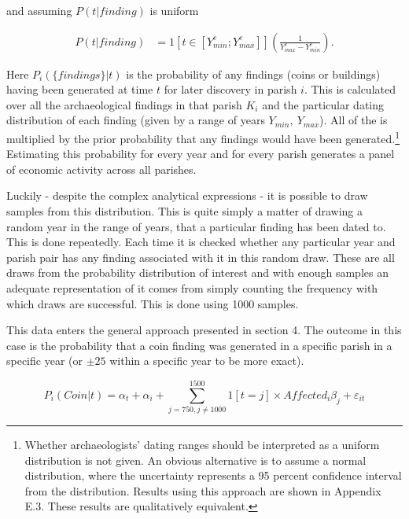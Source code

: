 \documentclass[11pt]{article}
\begin{document}
and assuming $P(t|finding)$ is uniform

\begin{equation}
\begin{split}
\label{eq:arch12}
P(t|finding)& = 1[t\in [Y_{min}^c;Y_{max}^c]] \left(\frac{1}{Y_{max}^c - Y_{min}^c}\right).
\end{split}
\end{equation}

Here $P_i(\{findings\}|t)$ is the probability of any findings (coins or buildings) having been generated at time $t$ for later discovery in parish $i$. This is calculated over all the archaeological findings in that parish $K_i$ and the particular dating distribution of each finding (given by a range of years $Y_{min},\: Y_{max}$). All of the is multiplied by the prior probability that any findings would have been generated.\footnote{Whether archaeologists' dating ranges should be interpreted as a uniform distribution is not given. An obvious alternative is to assume a normal distribution, where the uncertainty represents a 95 percent confidence interval from the distribution. Results using this approach are shown in Appendix E.3. These results are qualitatively equivalent.} Estimating this probability for every year and for every parish generates a panel of economic activity across all parishes. 

Luckily - despite the complex analytical expressions - it is possible to draw samples from this distribution. This is quite simply a matter of drawing a random year in the range of years, that a particular finding has been dated to. This is done repeatedly. Each time it is checked whether any particular year and parish pair has any finding associated with it in this random draw. These are all draws from the probability distribution of interest and with enough samples an adequate representation of it comes from simply counting the frequency with which draws are successful. This is done using 1000 samples. 

This data enters the general approach presented in section 4. The outcome in this case is the probability that a coin finding was generated in a specific parish in a specific year (or $\pm 25$ within a specific year to be more exact).

\begin{equation}
\label{eq:eq7_4}
P_i(Coin|t) = \alpha_t + \alpha_i + \sum_{j = 750, j\neq 1000}^{1500} 1[t=j]\times Affected_{i}\beta_{j}  + \varepsilon_{it}
\end{equation}
\end{document}
